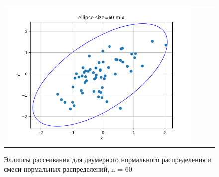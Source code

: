 \begin{figure}[H]
\begin{tabular}{cccc}
		\includegraphics[scale=0.3]{ellipse_60_mix.png}
	\end{tabular}
	\caption{Эллипсы рассеивания для двумерного нормального распределения и смеси нормальных распределений, n = 60}
\end{figure}

